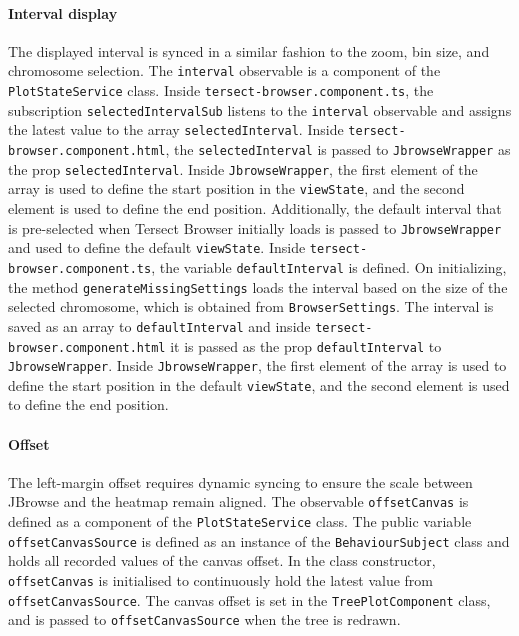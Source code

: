 \documentclass[12pt]{article}
\begin{document}
\begin{itemize}
\paragraph{Interval display}
The displayed interval is synced in a similar fashion to the zoom, bin size, and chromosome selection. The \verb +interval+ observable is a component of the \verb +PlotStateService+ class. Inside \verb +tersect-browser.component.ts+, the subscription \verb +selectedIntervalSub+ listens to the \verb +interval+ observable and assigns the latest value to the array \verb +selectedInterval+. Inside \verb +tersect-browser.component.html+, the \verb +selectedInterval+ is passed to \verb +JbrowseWrapper+ as the prop \verb +selectedInterval+. Inside \verb +JbrowseWrapper+, the first element of the array is used to define the start position in the \verb +viewState+, and the second element is used to define the end position. 
Additionally, the default interval that is pre-selected when Tersect Browser initially loads is passed to \verb +JbrowseWrapper+ and used to define the default \verb +viewState+. Inside \verb +tersect-browser.component.ts+, the variable \verb +defaultInterval+ is defined. On initializing, the method \verb +generateMissingSettings+ loads the interval based on the size of the selected chromosome, which is obtained from \verb +BrowserSettings+. The interval is saved as an array to \verb +defaultInterval+ and inside \verb +tersect-browser.component.html+ it is passed as the prop \verb +defaultInterval+ to \verb +JbrowseWrapper+. Inside \verb +JbrowseWrapper+, the first element of the array is used to define the start position in the default \verb +viewState+, and the second element is used to define the end position. 

\paragraph{Offset}
The left-margin offset requires dynamic syncing to ensure the scale between JBrowse and the heatmap remain aligned. The observable \verb +offsetCanvas+ is defined as a component of the \verb +PlotStateService+ class. The public variable \verb +offsetCanvasSource+ is defined as an instance of the \verb +BehaviourSubject+ class and holds all recorded values of the canvas offset. In the class constructor, \verb +offsetCanvas+ is initialised to continuously hold the latest value from \verb +offsetCanvasSource+. The canvas offset is set in the \verb +TreePlotComponent+ class, and is passed to \verb +offsetCanvasSource+ when the tree is redrawn. 


\end{itemize}
\end{document}
